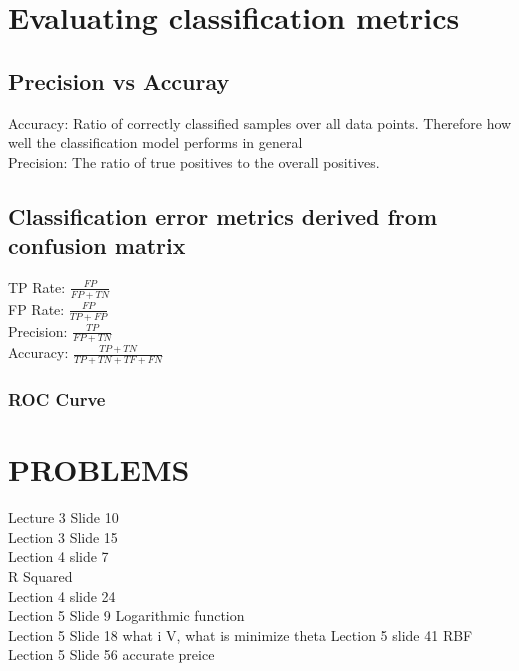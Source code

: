 \documentclass{article}
\begin{document}
\section{Evaluating classification metrics}
\subsection{Precision vs Accuray}
Accuracy: Ratio of correctly classified samples over all data points. Therefore how well the classification model performs in general \\ 
Precision: The ratio of true positives to the overall positives.
\subsection{Classification error metrics derived from confusion matrix}
TP Rate: $\frac{FP}{FP+TN}$\\
FP Rate: $\frac{FP}{TP+FP}$ \\ 
Precision: $\frac{TP}{FP+TN} $\\
Accuracy: $\frac{TP+TN}{TP+TN+TF+FN} $
\subsubsection{ROC Curve}

\section{PROBLEMS}
Lecture 3 Slide 10\\
Lection 3 Slide 15\\
Lection 4 slide 7\\
R Squared\\
Lection 4 slide 24\\
Lection 5 Slide 9 Logarithmic function \\
Lection 5 Slide 18 what i V, what is minimize theta
Lection 5 slide 41 RBF \\
Lection 5 Slide 56 accurate preice
\end{document}

